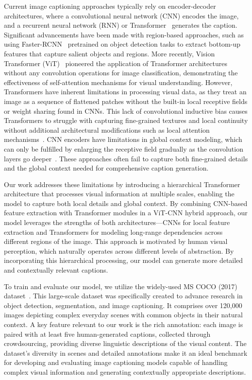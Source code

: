\documentclass[10pt,twocolumn,letterpaper]{article}
\begin{document}
Current image captioning approaches typically rely on encoder-decoder architectures, where a convolutional neural network (CNN) encodes the image, and a recurrent neural network (RNN) or Transformer~\cite{vaswani2017attention} generates the caption. Significant advancements have been made with region-based approaches, such as using Faster-RCNN~\cite{FasterRCNN} pretrained on object detection tasks to extract bottom-up~\cite{BottomUp} features that capture salient objects and regions. More recently, Vision Transformer (ViT)~\cite{ViT} pioneered the application of Transformer architectures without any convolution operations for image classification, demonstrating the effectiveness of self-attention mechanisms for visual understanding. However, Transformers have inherent limitations in processing visual data, as they treat an image as a sequence of flattened patches without the built-in local receptive fields or weight sharing found in CNNs. This lack of convolutional inductive bias causes Transformers to struggle with capturing fine-grained textures and local continuity without additional architectural modifications such as local attention mechanisms~\cite{liu2021swin}. CNN encoders have limitations in global context modeling, which can only be fulfilled by enlarging the receptive field gradually as the convolution layers go deeper~\cite{liu2021cptr}. These approaches often fail to capture both fine-grained details and the global context needed for comprehensive caption generation.

Our work addresses these limitations by introducing a hierarchical Transformer architecture that processes visual information at multiple scales, enabling the model to capture both local details and global context. By combining CNN-based feature extraction with Transformer modules in a ViT-CNN hybrid approach, our model leverages the strengths of both architectures—CNNs for local feature extraction and Transformers for modeling long-range dependencies across different regions of the image. This approach is motivated by human visual perception, which naturally operates across different levels of abstraction. By incorporating this hierarchical processing, our model can generate more detailed and contextually relevant captions.

To train and evaluate our model, we utilize the widely-used MS COCO (2017) dataset~\cite{COCO}. This large-scale dataset was specifically created to advance research in object detection, segmentation, and image captioning. It comprises over 120,000 images depicting complex everyday scenes with common objects in their natural context. A key feature relevant to our work is the rich annotation: each image is paired with at least five human-generated captions, collected through crowdsourcing, providing diverse linguistic descriptions of the visual content. The dataset's diversity in scenes and detailed annotations make it an ideal benchmark for developing and evaluating image captioning models capable of handling complex visual information and generating contextually appropriate descriptions.
\end{document}
